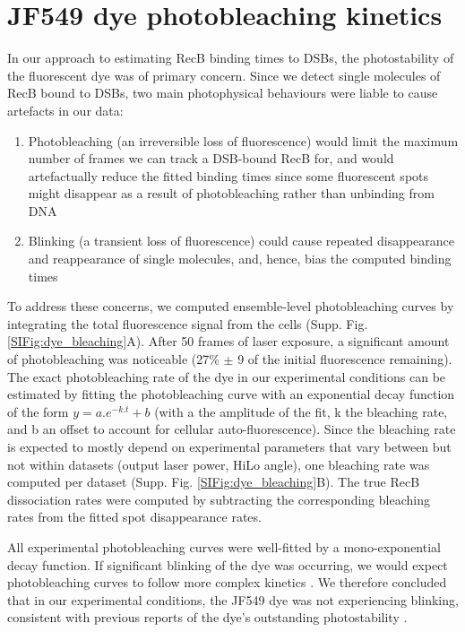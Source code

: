 \captionsetup*{format=largeformat}
\section{JF549 dye photobleaching kinetics}
\label{note:dye_bleaching} 

In our approach to estimating RecB binding times to DSBs, the photostability of the fluorescent dye was of primary concern. Since we detect single molecules of RecB bound to DSBs, two main photophysical behaviours were liable to cause artefacts in our data:
\begin{enumerate}
    \item Photobleaching (an irreversible loss of fluorescence) would limit the maximum number of frames we can track a DSB-bound RecB for, and would artefactually reduce the fitted binding times since some fluorescent spots might disappear as a result of photobleaching rather than unbinding from DNA
    \item Blinking (a transient loss of fluorescence) could cause repeated disappearance and reappearance of single molecules, and, hence, bias the computed binding times
\end{enumerate}

To address these concerns, we computed ensemble-level photobleaching curves by integrating the total fluorescence signal from the cells (Supp. Fig. \ref{SIFig:dye_bleaching}A). After 50 frames of laser exposure, a significant amount of photobleaching was noticeable (27\% $\pm$ 9 of the initial fluorescence remaining). The exact photobleaching rate of the dye in our experimental conditions can be estimated by fitting the photobleaching curve with an exponential decay function of the form $y=a.e^{-k.t}+b$ (with a the amplitude of the fit, k the bleaching rate, and b an offset to account for cellular auto-fluorescence). Since the bleaching rate is expected to mostly depend on experimental parameters that vary between but not within datasets (output laser power, HiLo angle), one bleaching rate was computed per dataset (Supp. Fig. \ref{SIFig:dye_bleaching}B). The true RecB dissociation rates were computed by subtracting the corresponding bleaching rates from the fitted spot disappearance rates.

All experimental photobleaching curves were well-fitted by a mono-exponential decay function. If significant blinking of the dye was occurring, we would expect photobleaching curves to follow more complex kinetics \cite{Thedie2017}. We therefore concluded that in our experimental conditions, the JF549 dye was not experiencing blinking, consistent with previous reports of the dye's outstanding photostability \cite{Grimm2015}.

